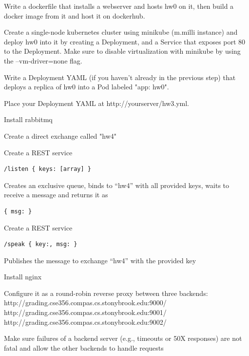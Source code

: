\documentclass[fancy,11pt,titlestyle=display]{style/elegantbook}
\begin{document}
\begin{problemset}
    \item Write a dockerfile that installs a webserver and hosts hw0 on it, then build a docker image from it and host it on dockerhub.
    \item Create a single-node kubernetes cluster using minikube (m.milli instance) and deploy hw0 into it by creating a Deployment, and a Service that exposes port 80 to the Deployment. Make sure to disable virtualization with minikube by using the --vm-driver=none flag.
    \item Write a Deployment YAML (if you haven't already in the previous step) that deploys a replica of hw0 into a Pod labeled "app: hw0".
    \item Place your Deployment YAML at http://yourserver/hw3.yml.
\end{problemset}

\begin{problemset}
    \item Install rabbitmq
    \item Create a direct exchange called "hw4"
    \item Create a REST service
\begin{lstlisting}
/listen { keys: [array] }
\end{lstlisting}
Creates an exclusive queue, binds to ``hw4'' with all provided keys, waits to receive a message and returns it as
\begin{lstlisting}
{ msg: }
\end{lstlisting}
    \item Create a REST service
\begin{lstlisting}
/speak { key:, msg: }
\end{lstlisting}
Publishes the message to exchange ``hw4'' with the provided key
\end{problemset}

\begin{problemset}

\item Install nginx
\item Configure it as a round-robin reverse proxy between three backends:\\
http://grading.cse356.compas.cs.stonybrook.edu:9000/ \\
http://grading.cse356.compas.cs.stonybrook.edu:9001/ \\
http://grading.cse356.compas.cs.stonybrook.edu:9002/
\item Make sure failures of a backend server (e.g., timeouts or 50X responses) are not fatal and allow the other backends to handle requests
\end{problemset}
\end{document}
